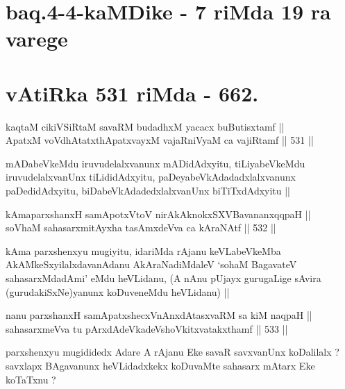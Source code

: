 \section*{baq.4-4-kaMDike - 7 riMda 19 ra varege}

\section*{vAtiRka 531 riMda - 662.}


\begin{shl}
kaqtaM cikiVSiRtaM savaRM budadhxM yacacx buButisxtamf || \\
ApatxM voVdhAtatxthA\s \s patxvayxM vajaRniVyaM ca vajiRtamf ||  531 ||  
\end{shl}

\begin{artha}
mADabeVkeMdu iruvudelalxvanunx mADidAdxyitu, tiLiyabeVkeMdu
iruvudelalxvanUnx tiLididAdxyitu, paDeyabeVkAdadadxlalxvanunx
paDedidAdxyitu, biDabeVkAdadedxlalxvanUnx biTiTxdAdxyitu ||
\end{artha}


\begin{shl}
kAmaparxshanxH samApotxV\s toV nirAkAknokxSXV\s BavananxqqpaH || \\
soV\s haM sahasarxmitAyxha tasAmxdeVva ca kAraNAtf ||  532 ||  
\end{shl}

\begin{artha}
kAma parxshenxyu mugiyitu, idariMda rAjanu keVLabeVkeMba
AkAMkeSxyilalxdavanAdanu AkAraNadiMdaleV `so\s haM BagavateV
sahasarxMdadAmi' eMdu heVLidanu, (A nAnu pUjayx gurugaLige sAvira
(gurudakiSxNe)yanunx koDuveneMdu heVLidanu) ||
\end{artha} 


\begin{shl}
nanu parxshanxH samApatxshecxVnAnxdAtasxvaRM sa kiM naqpaH || \\
sahasarxmeVva tu pArxdAdeVkadeVshoVkitxvatakxthamf ||  533 ||  
\end{shl}

\begin{artha}
parxshenxyu mugididedx Adare A rAjanu Eke savaR savxvanUnx koDalilalx
? savxlapx BAgavanunx heVLidadxkekx koDuvaMte sahasarx mAtarx Eke
koTaTxnu ?
\end{artha}

